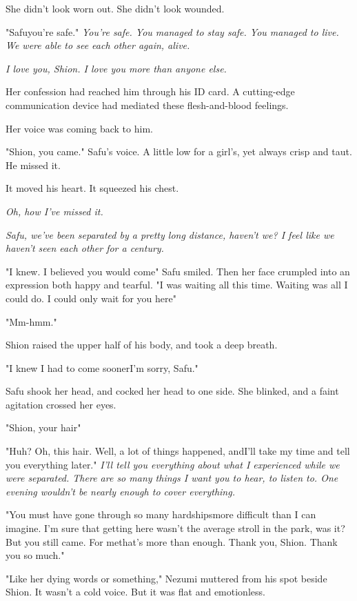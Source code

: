 She didn't look worn out. She didn't look wounded.

"Safu\el you're safe." \emph{You're safe. You managed to stay safe. You
managed to live. We were able to see each other again, alive.}

\emph{I love you, Shion. I love you more than anyone else.}

Her confession had reached him through his ID card. A cutting-edge
communication device had mediated these flesh-and-blood feelings.

Her voice was coming back to him.

"Shion, you came." Safu's voice. A little low for a girl's, yet always
crisp and taut. He missed it.

It moved his heart. It squeezed his chest.

\emph{Oh, how I've missed it.}

\emph{Safu, we've been separated by a pretty long distance, haven't we? I feel
like we haven't seen each other for a century.}

"I knew. I believed you would come\el " Safu smiled. Then her face
crumpled into an expression both happy and tearful. "I was waiting all
this time. Waiting was all I could do. I could only wait for you
here\el "

"Mm-hmm."

Shion raised the upper half of his body, and took a deep breath.

"I knew I had to come sooner\el I'm sorry, Safu."

Safu shook her head, and cocked her head to one side. She blinked, and a
faint agitation crossed her eyes.

"Shion, your hair\el "

"Huh? Oh, this hair. Well, a lot of things happened, and\el I'll take my
time and tell you everything later." \emph{I'll tell you everything about what
I experienced while we were separated. There are so many things I want
you to hear, to listen to. One evening wouldn't be nearly enough to
cover everything.}

"You must have gone through so many hardships\el more difficult than I
can imagine. I'm sure that getting here wasn't the average stroll in the
park, was it? But you still came. For me\el that's more than enough.
Thank you, Shion. Thank you so much."

"Like her dying words or something," Nezumi muttered from his spot
beside Shion. It wasn't a cold voice. But it was flat and emotionless.

